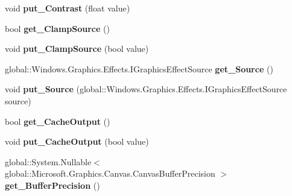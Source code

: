 \begin{DoxyCompactItemize}
void {\bfseries put\+\_\+\+Contrast} (float value)
\item 
\mbox{\label{class_microsoft_1_1_graphics_1_1_canvas_1_1_effects_1_1_contrast_effect_adfdc196eeb8d4ab260ff8a02b91a232f}} 
bool {\bfseries get\+\_\+\+Clamp\+Source} ()
\item 
\mbox{\label{class_microsoft_1_1_graphics_1_1_canvas_1_1_effects_1_1_contrast_effect_aba9bdffcb03711ad9dcf51b730e58b8e}} 
void {\bfseries put\+\_\+\+Clamp\+Source} (bool value)
\item 
\mbox{\label{class_microsoft_1_1_graphics_1_1_canvas_1_1_effects_1_1_contrast_effect_a72dc5fce02408757eaba54af8a0d067c}} 
global\+::\+Windows.\+Graphics.\+Effects.\+I\+Graphics\+Effect\+Source {\bfseries get\+\_\+\+Source} ()
\item 
\mbox{\label{class_microsoft_1_1_graphics_1_1_canvas_1_1_effects_1_1_contrast_effect_a80a8fa221aef734932fecc91048e1ee8}} 
void {\bfseries put\+\_\+\+Source} (global\+::\+Windows.\+Graphics.\+Effects.\+I\+Graphics\+Effect\+Source source)
\item 
\mbox{\label{class_microsoft_1_1_graphics_1_1_canvas_1_1_effects_1_1_contrast_effect_a4fe46686dd977f30e37f1501afa15b90}} 
bool {\bfseries get\+\_\+\+Cache\+Output} ()
\item 
\mbox{\label{class_microsoft_1_1_graphics_1_1_canvas_1_1_effects_1_1_contrast_effect_a1e32440921f9a7994c6dd646e9880c68}} 
void {\bfseries put\+\_\+\+Cache\+Output} (bool value)
\item 
\mbox{\label{class_microsoft_1_1_graphics_1_1_canvas_1_1_effects_1_1_contrast_effect_a61bc14a21a450d7a87ffcc2aa0e05690}} 
global\+::\+System.\+Nullable$<$ global\+::\+Microsoft.\+Graphics.\+Canvas.\+Canvas\+Buffer\+Precision $>$ {\bfseries get\+\_\+\+Buffer\+Precision} ()

\end{DoxyCompactItemize}
